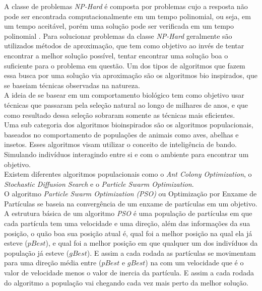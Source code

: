 \indent A classe de problemas \textit{NP-Hard} é composta por problemas cujo a resposta não pode ser encontrada computacionalmente em um tempo polinomial, ou seja, em um tempo aceitável, porém uma solução pode ser verificada em um tempo polinomial \cite{Eswaramurthy2008}.
Para solucionar problemas da classe \textit{NP-Hard} geralmente são utilizados métodos de aproximação, que tem como objetivo ao invés de tentar encontrar a melhor solução possível, tentar encontrar uma solução boa o suficiente para o problema em questão.
Um dos tipos de algoritmos que fazem essa busca por uma solução via aproximação são os algoritmos bio inspirados, que se baseiam técnicas observadas na natureza.\\
\indent A ideia de se basear em um comportamento biológico tem como objetivo usar técnicas que passaram pela seleção natural ao longo de milhares de anos, e que como resultado dessa seleção sobraram somente as técnicas mais eficientes.\\
\indent Uma sub categoria dos algoritmos bioinspirados são os algoritmos populacionais, baseados no comportamento de populações de animais como aves, abelhas e insetos.
Esses algoritmos visam utilizar o conceito de inteligência de bando. Simulando indivíduos interagindo entre si e com o ambiente para encontrar um objetivo.\\
Existem diferentes algoritmos populacionais como o \textit{Ant Colony Optimization}, o \textit{Stochastic Diffusion Search} e o \textit{Particle Swarm Optimization}.\\
\indent O algoritmo \textit{Particle Swarm Optimization} \textit{(PSO)} ou Optimização por Enxame de Partículas se baseia na convergência de um enxame de partículas em um objetivo.
A estrutura básica de um algoritmo \textit{PSO} é uma população de partículas em que cada partícula tem uma velocidade e uma direção, além das informações da sua posição, o quão boa sua posição atual é, qual foi a melhor posição na qual ela já esteve ($pBest$), e qual foi a melhor posição em que qualquer um dos indivíduos da população já esteve ($gBest$).
E assim a cada rodada as partículas se movimentam para uma direção média entre ($pBest$ e $gBest$) na com um velocidade que é o valor de velocidade menos o valor de inercia da partícula. 
E assim a cada rodada do algoritmo a população vai chegando cada vez mais perto da melhor solução.\\
